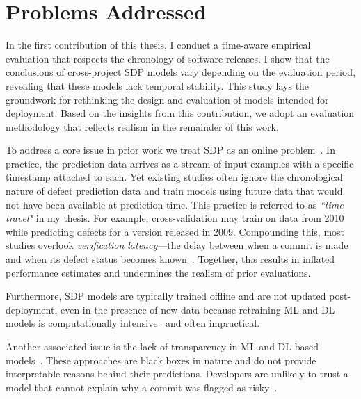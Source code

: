 \documentclass[\main/thesis.tex]{subfiles}
\begin{document}
\section{Problems Addressed}
\label{sec:motivation}

In the first contribution of this thesis, I conduct a time-aware empirical evaluation that respects the chronology of software releases. I show that the conclusions of cross-project SDP models vary depending on the evaluation period, revealing that these models lack temporal stability. This study lays the groundwork for rethinking the design and evaluation of models intended for deployment. Based on the insights from this contribution, we adopt an evaluation methodology that reflects realism in the remainder of this work.

To address a core issue in prior work we treat SDP as an online  problem~\cite{cabral2019class}\cite{tabassum2020investigation}. In practice, the prediction data arrives as a stream of input examples with a specific timestamp attached to each. Yet existing studies often ignore the chronological nature of defect prediction data and train models using future data that would not have been available at prediction time. This practice is referred to as \textit{``time travel"} in my thesis. For example, cross-validation may train on data from 2010 while predicting defects for a version released in 2009. Compounding this, most studies overlook \textit{verification latency}—the delay between when a commit is made and when its defect status becomes known~\cite{cabral2019class}. Together, this results in inflated performance estimates and undermines the realism of prior evaluations.

Furthermore, SDP models are typically trained offline and are not updated post-deployment, even in the presence of new data because retraining ML and DL models is computationally intensive~\cite{mahadevan2024cost} and often impractical. %

Another associated issue is the lack of transparency in ML and DL based models~\cite{rudin2019stop}. These approaches are black boxes in nature and do not provide interpretable reasons behind their predictions. Developers are unlikely to trust a model that cannot explain why a commit was flagged as risky~\cite{dam2018explainable}. 
\end{document}
